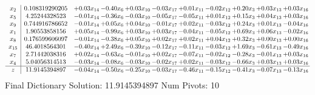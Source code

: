 \documentclass[9pt]{article}
\begin{document}
 \[\begin{array}{c| c c@{\hskip 2pt} c@{\hskip 2pt} c@{\hskip 2pt} c@{\hskip 2pt} c@{\hskip 2pt} c@{\hskip 2pt} c@{\hskip 2pt} c@{\hskip 2pt} c@{\hskip 2pt} }
 x_{2}   &  0.108319290205 & +  0.03 x_{14} & -0.40 x_{6} & +  0.03 x_{10} & -0.03 x_{17} & +  0.01 x_{11} & -0.02 x_{12} & +  0.20 x_{3} & +  0.03 x_{13} & +  0.03 x_{16}\\
 x_{5}   &  4.25244328523 & -0.01 x_{14} & -0.36 x_{6} & -0.03 x_{10} & -0.05 x_{17} & -0.05 x_{11} & +  0.01 x_{12} & +  0.15 x_{3} & +  0.04 x_{13} & +  0.03 x_{16}\\
 x_{9}   &  0.744916786652 & -0.01 x_{14} & +  0.05 x_{6} & +  0.04 x_{10} & -0.01 x_{17} & +  0.02 x_{11} & -0.03 x_{12} & +  0.24 x_{3} & +  0.01 x_{13} & -0.04 x_{16}\\
 x_{1}   &  1.90553858156 & +  0.05 x_{14} & -0.99 x_{6} & +  0.03 x_{10} & +  0.03 x_{17} & -0.04 x_{11} & -0.05 x_{12} & +  0.69 x_{3} & +  0.06 x_{13} & -0.02 x_{16}\\
 x_{8}   &  0.176599606097 & -0.01 x_{14} & -0.38 x_{6} & +  0.05 x_{10} & +  0.02 x_{17} & +  0.02 x_{11} & +  0.04 x_{12} & +  0.32 x_{3} & +  0.00 x_{13} & +  0.00 x_{16}\\
 x_{15}   &  46.4018564301 & -0.40 x_{14} & +  2.49 x_{6} & -0.39 x_{10} & -0.12 x_{17} & -0.11 x_{11} & -0.03 x_{12} & +  1.69 x_{3} & -0.61 x_{13} & -0.49 x_{16}\\
 x_{7}   &  2.71442038316 & +  0.02 x_{14} & -0.63 x_{6} & -0.01 x_{10} & +  0.02 x_{17} & -0.07 x_{11} & -0.02 x_{12} & -0.28 x_{3} & -0.01 x_{13} & +  0.03 x_{16}\\
 x_{4}   &  5.04056314513 & -0.03 x_{14} & -0.08 x_{6} & -0.03 x_{10} & -0.02 x_{17} & +  0.02 x_{11} & -0.03 x_{12} & -0.66 x_{3} & +  0.03 x_{13} & +  0.03 x_{16}\\
\hline
z    &  11.9145394897 & -0.04 x_{14} & -0.50 x_{6} & -0.25 x_{10} & -0.03 x_{17} & -0.46 x_{11} & -0.15 x_{12} & -0.41 x_{3} & -0.07 x_{13} & -0.13 x_{16}\\
\end{array}\]
Final Dictionary
Solution:  11.9145394897
Num Pivots:  10
\end{document}
